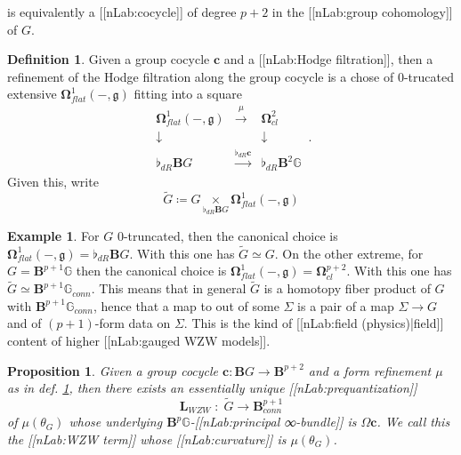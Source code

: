 \documentclass[12pt,titlepage]{article}
\newcommand{\itexarray}[1]{\begin{matrix}#1\end{matrix}}
\theoremstyle{plain}
\newtheorem{prop}{Proposition}
\theoremstyle{definition}
\newtheorem{defn}{Definition}
\newtheorem{example}{Example}
\theoremstyle{remark}
\begin{document}
is equivalently a [[nLab:cocycle]] of degree $p+2$ in the [[nLab:group cohomology]] of $G$.
\begin{defn}
\label{FormRefinementOfCocycle}\hypertarget{FormRefinementOfCocycle}{}
Given a group cocycle $\mathbf{c}$ and a [[nLab:Hodge filtration]], then a refinement of the Hodge filtration along the group cocycle is a chose of 0-trucated extensive $\mathbf{\Omega}^1_{flat}(-,\mathfrak{g})$ fitting into a square
\begin{displaymath}
\itexarray{
    \mathbf{\Omega}^1_{flat}(-,\mathfrak{g})
    &\stackrel{\mu}{\longrightarrow}&
    \mathbf{\Omega}^2_{cl}
    \\
    \downarrow && \downarrow
    \\
    \flat_{dR} \mathbf{B}G
    &\stackrel{\flat_{dR}\mathbf{c}}{\longrightarrow}&
    \flat_{dR} \mathbf{B}^2 \mathbb{G}
  }
  \,.
\end{displaymath}
Given this, write
\begin{displaymath}
\tilde G
  \coloneqq G \underset{\flat_{dR}\mathbf{B}G}{\times} \mathbf{\Omega}^1_{flat}(-,\mathfrak{g})
\end{displaymath}
\end{defn}
\begin{example}
\label{}\hypertarget{}{}
For $G$ 0-truncated, then the canonical choice is $\mathbf{\Omega}^1_{flat}(-,\mathfrak{g}) = \flat_{dR}\mathbf{B}G$. With this one has $\tilde G \simeq G$.
On the other extreme, for $G = \mathbf{B}^{p+1}\mathbb{G}$ then the canonical choice is $\mathbf{\Omega}^1_{flat}(-,\mathfrak{g}) = \mathbf{\Omega}^{p+2}_{cl}$. With this one has $\tilde G \simeq \mathbf{B}^{p+1}\mathbb{G}_{conn}$.
This means that in general $\tilde G$ is a homotopy fiber product of $G$ with $\mathbf{B}^{p+1}\mathbb{G}_{conn}$, hence that a map to out of some $\Sigma$ is a pair of a map $\Sigma \to G$ and of $(p+1)$-form data on $\Sigma$. This is the kind of [[nLab:field (physics)|field]] content of higher [[nLab:gauged WZW models]].
\end{example}
\begin{prop}
\label{WZWTermFromCocycle}\hypertarget{WZWTermFromCocycle}{}
Given a group cocycle $\mathbf{c} \colon \mathbf{B}G \to \mathbf{B}^{p+2}$ and a form refinement $\mu$ as in def. \ref{FormRefinementOfCocycle}, then there exists an essentially unique [[nLab:prequantization]]
\begin{displaymath}
\mathbf{L}_{WZW}
  \;\colon\;
  \tilde G \longrightarrow \mathbf{B}^{p+1}_{conn}
\end{displaymath}
of $\mu(\theta_G)$ whose underlying $\mathbf{B}^p\mathbb{G}$-[[nLab:principal ∞-bundle]] is $\Omega \mathbf{c}$.
We call this the \emph{[[nLab:WZW term]]} whose [[nLab:curvature]] is $\mu(\theta_G)$.
\end{prop}
\end{document}
